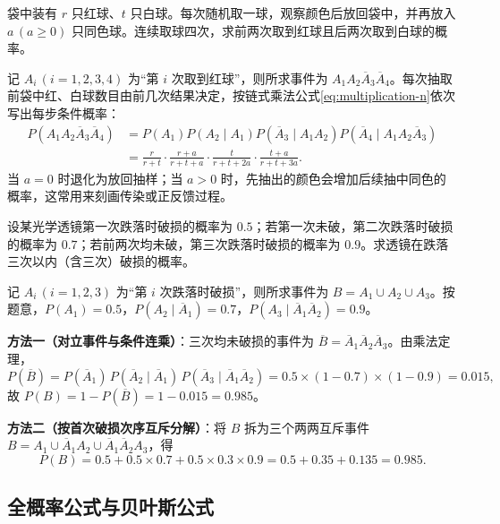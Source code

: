 \begin{example}[title={波利亚坛子（P\'olya urn）模型}]
\label{eg:polya-urn}
袋中装有 $r$ 只红球、$t$ 只白球。每次随机取一球，观察颜色后放回袋中，并再放入 $a\,(a\ge 0)$ 只同色球。连续取球四次，求前两次取到红球且后两次取到白球的概率。
\begin{solution}
记 $A_i\,(i=1,2,3,4)$ 为“第 $i$ 次取到红球”，则所求事件为 $A_1A_2\overline{A}_3\overline{A}_4$。每次抽取前袋中红、白球数目由前几次结果决定，按链式乘法公式\eqref{eq:multiplication-n}依次写出每步条件概率：
\[
\begin{aligned}
  P(A_1A_2\overline{A}_3\overline{A}_4)
  &=P(A_1)P(A_2\mid A_1)P(\overline{A}_3\mid A_1A_2)P(\overline{A}_4\mid A_1A_2\overline{A}_3)\\
  &=\frac{r}{r+t}\cdot\frac{r+a}{r+t+a}\cdot\frac{t}{r+t+2a}\cdot\frac{t+a}{r+t+3a}.
\end{aligned}
\]
当 $a=0$ 时退化为放回抽样；当 $a>0$ 时，先抽出的颜色会增加后续抽中同色的概率，这常用来刻画传染或正反馈过程。
\end{solution}
\end{example}

\begin{example}[title={光学透镜跌落破损的条件生存计算}]
\label{eg:lens-survival}
设某光学透镜第一次跌落时破损的概率为 $0.5$；若第一次未破，第二次跌落时破损的概率为 $0.7$；若前两次均未破，第三次跌落时破损的概率为 $0.9$。求透镜在跌落三次以内（含三次）破损的概率。
\begin{solution}
记 $A_i\,(i=1,2,3)$ 为“第 $i$ 次跌落时破损”，则所求事件为 $B=A_1\cup A_2\cup A_3$。按题意，$P(A_1)=0.5$，$P(A_2\mid\overline{A}_1)=0.7$，$P(A_3\mid\overline{A}_1\overline{A}_2)=0.9$。

\textbf{方法一（对立事件与条件连乘）}：三次均未破损的事件为 $\overline{B}=\overline{A}_1\overline{A}_2\overline{A}_3$。由乘法定理，
\[
  P(\overline{B})=P(\overline{A}_1)\,P(\overline{A}_2\mid\overline{A}_1)\,P(\overline{A}_3\mid\overline{A}_1\overline{A}_2)
  =0.5\times(1-0.7)\times(1-0.9)=0.015,
\]
故 $P(B)=1-P(\overline{B})=1-0.015=0.985$。

\textbf{方法二（按首次破损次序互斥分解）}：将 $B$ 拆为三个两两互斥事件 $B=A_1\cup\overline{A}_1 A_2\cup\overline{A}_1\overline{A}_2 A_3$，得
\[
  P(B)=0.5+0.5\times 0.7+0.5\times 0.3\times 0.9=0.5+0.35+0.135=0.985.
\]
\end{solution}
\end{example}

\subsection{全概率公式与贝叶斯公式}


